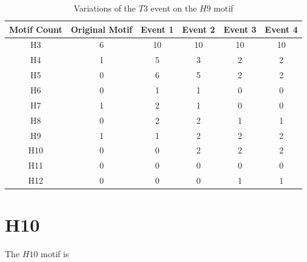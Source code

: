 \begin{table}
    \centering
    \begin{tabular}{||c c c c c c||} 
    \hline
    Motif Count & Original Motif & Event 1 & Event 2 & Event 3 & Event 4 \\ [0.5ex] 
    \hline\hline
    H3 & 6 & 10 & 10 & 10 & 10\\ 
    \hline
    H4 & 1 & 5 & 3 & 2 & 2 \\
    \hline
    H5 & 0 & 6 & 5 & 2 & 2 \\
    \hline
    H6 & 0 & 1 & 1 & 0 & 0 \\
    \hline
    H7 & 1 & 2 & 1 & 0 & 0 \\
    \hline
    H8 & 0 & 2 & 2 & 1 & 1\\
    \hline
    H9 & 1 & 1 & 2 & 2 & 2\\
    \hline
    H10 & 0 & 0 & 2 & 2 & 2\\
    \hline
    H11 & 0 & 0 & 0 & 0 & 0\\
    \hline
    H12 & 0 & 0 & 0 & 1 & 1\\
    \hline
   \end{tabular}
   \caption{Variations of the $T3$ event on the $H9$ motif}
   \label{table:18}
\end{table}

\section{H10}
The $H10$ motif is

